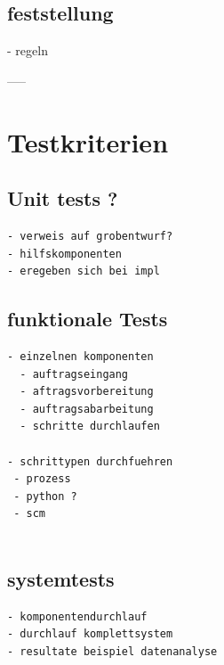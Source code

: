 \subsection{feststellung}
 - regeln


-----
\section{Testkriterien}
\subsection{Unit tests ?}


\begin{verbatim}
- verweis auf grobentwurf?
- hilfskomponenten
- eregeben sich bei impl
\end{verbatim}

\subsection{funktionale Tests}

\begin{verbatim}
- einzelnen komponenten
  - auftragseingang
  - aftragsvorbereitung
  - auftragsabarbeitung
  - schritte durchlaufen

- schrittypen durchfuehren
 - prozess
 - python ?
 - scm


\end{verbatim}

\subsection{systemtests}

\begin{verbatim}
- komponentendurchlauf
- durchlauf komplettsystem
- resultate beispiel datenanalyse

\end{verbatim}

